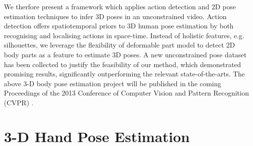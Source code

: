 \documentclass[10pt, a4paper]{article}
\begin{document}
We therfore present a framework which applies action detection and 2D pose estimation techniques to infer 3D poses in an unconstrained video. Action detection offers spatiotemporal priors to 3D human pose estimation by both recognising and localising actions in space-time. Instead of holistic features, e.g. silhouettes, we leverage the flexibility of deformable part model to detect 2D body parts as a feature to estimate 3D poses. A new unconstrained pose dataset has been collected to justify the feasibility of our method, which demonstrated promising results, significantly outperforming the relevant state-of-the-arts. The above 3-D body pose estimation project will be published in the coming Proceedings of the 2013 Conference of Computer Vision and Pattern Recognition (CVPR) \cite{Yu2013}. 

\section{3-D Hand Pose Estimation} 
\end{document}
